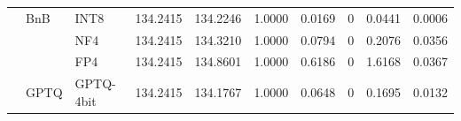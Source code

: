 \begin{table}[t]
{\begin{tabular}{ll l rrrrrrr}
 & BnB & INT8 & 134.2415 & 134.2246 & 1.0000 & 0.0169 & \cellcolor{cyan!12} $0$ & 0.0441 & 0.0006 \\
 &  & NF4 & 134.2415 & 134.3210 & 1.0000 & 0.0794 & \cellcolor{cyan!12} $0$ & 0.2076 & 0.0356 \\
 &  & FP4 & 134.2415 & 134.8601 & 1.0000 & 0.6186 & \cellcolor{cyan!12} $0$ & 1.6168 & 0.0367 \\
 & GPTQ & GPTQ-4bit & 134.2415 & 134.1767 & 1.0000 & 0.0648 & \cellcolor{cyan!12} $0$ & 0.1695 & 0.0132 \\
\bottomrule
\end{tabular}}
\end{table}
